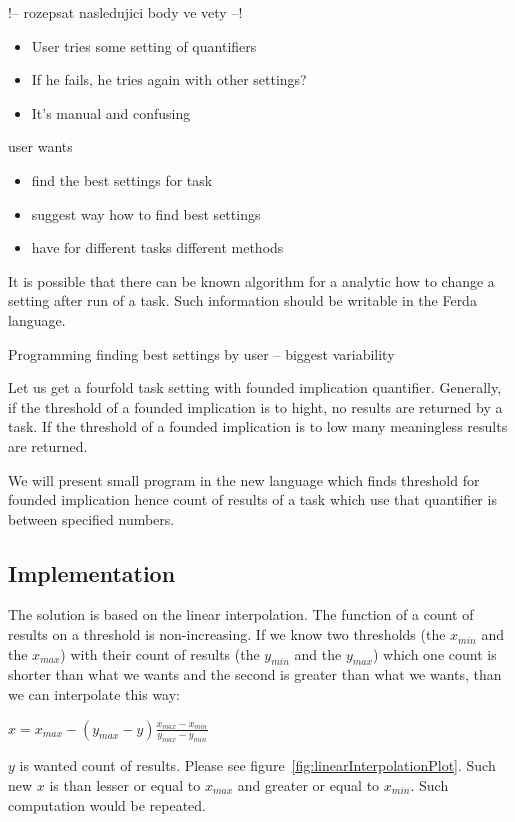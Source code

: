 \documentclass[a4paper,12pt]{book}
\begin{document}
!-- rozepsat nasledujici body ve vety --!

\begin{itemize}
			\item User tries some setting of quantifiers
			\item If he fails, he tries again with other settings?
			\item It's manual and confusing
\end{itemize}
		user wants
		\begin{itemize}
			\item find the best settings for task
			\item suggest way how to find best settings
			\item have for different tasks different methods
		\end{itemize}

It is possible that there can be known algorithm for a analytic how to change a setting after run of a task. Such information should be writable in the Ferda language.

Programming finding best settings by user -- biggest variability

Let us get a fourfold task setting with founded implication quantifier. Generally, if the threshold of a founded implication is to hight, no results are returned by a task. If the threshold of a founded implication is to low many meaningless results are returned.

We will present small program in the new language which finds threshold for founded implication hence count of results of a task which use that quantifier is between specified numbers.

\subsection{Implementation}
The solution is based on the linear interpolation. The function of a count of results on a threshold is non-increasing. If we know two thresholds (the $x_{min}$ and the $x_{max}$) with their count of results (the $y_{min}$ and the $y_{max}$) which one count is shorter than what we wants and the second is greater than what we wants, than we can interpolate this way: 

\begin{math}
x = x_{max} - (y_{max} - y)\frac{x_{max} - x_{min}}{y_{max} - y_{min}}
\end{math}

$y$ is wanted count of results. Please see figure~\ref{fig:linearInterpolationPlot}. Such new $x$ is than lesser or equal to $x_{max}$ and greater or equal to $x_{min}$. Such computation would be repeated.
\end{document}
